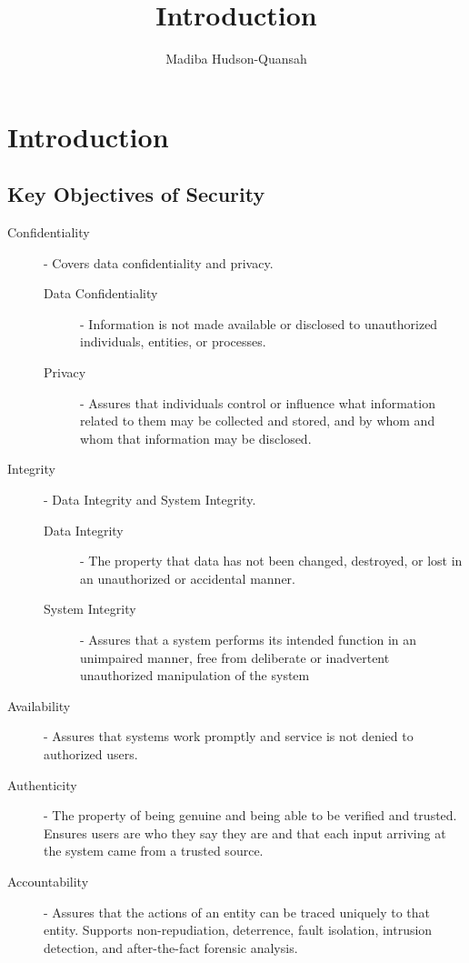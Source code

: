 \documentclass[12pt letter]{report}
\title{\Huge{Introduction}}
\author{\huge{Madiba Hudson-Quansah}}
\date{}
\begin{document}
\maketitle
\newpage
{}
\tableofcontents
\pagebreak

\chapter{Introduction}


\section{Key Objectives of Security}

\begin{description}
  \item[Confidentiality] - Covers data confidentiality and privacy.
    \begin{description}
      \item[Data Confidentiality]  - Information is not made
        available or disclosed to unauthorized individuals, entities,
        or processes.
      \item[Privacy] - Assures that individuals control or influence
        what information related to them may be collected and stored,
        and by whom and whom that information may be disclosed.
    \end{description}
  \item[Integrity] - Data Integrity and  System Integrity.
    \begin{description}
      \item[Data Integrity]  - The property that data has not been
        changed, destroyed, or lost in an unauthorized or accidental manner.
      \item[System Integrity] - Assures  that a system performs its
        intended function in an unimpaired manner, free from
        deliberate or inadvertent unauthorized manipulation of the system
    \end{description}
  \item[Availability] - Assures that systems work promptly and
    service is not denied to authorized users.
  \item[Authenticity] - The property of being genuine and being able
    to be verified and trusted. Ensures users are who they say they
    are and that each input arriving at the system came from a trusted source.
  \item[Accountability] - Assures that the actions of an entity can
    be traced uniquely to that entity. Supports non-repudiation,
    deterrence, fault isolation, intrusion detection, and
    after-the-fact forensic analysis.
\end{description}
\end{document}
